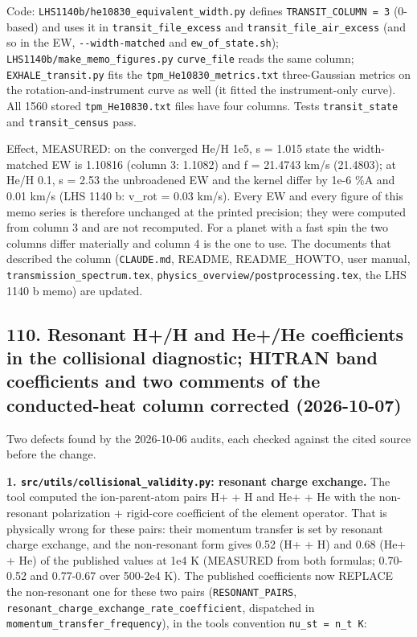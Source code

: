 \documentclass[english,a4paper]{my_memo}
\begin{document}
Code: \texttt{LHS1140b/he10830\_equivalent\_width.py} defines \texttt{TRANSIT\_COLUMN\ =\ 3}
(0-based) and uses it in \texttt{transit\_file\_excess} and \texttt{transit\_file\_air\_excess}
(and so in the EW, \texttt{-\/-width-matched} and \texttt{ew\_of\_state.sh});
\texttt{LHS1140b/make\_memo\_figures.py} \texttt{curve\_file} reads the same column;
\texttt{EXHALE\_transit.py} fits the \texttt{tpm\_He10830\_metrics.txt} three-Gaussian metrics
on the rotation-and-instrument curve as well (it fitted the instrument-only
curve). All 1560 stored \texttt{tpm\_He10830.txt} files have four columns. Tests
\texttt{transit\_state} and \texttt{transit\_census} pass.

Effect, MEASURED: on the converged He/H 1e5, s = 1.015 state the width-matched
EW is 1.10816 (column 3: 1.1082) and f = 21.4743 km/s (21.4803); at He/H 0.1,
s = 2.53 the unbroadened EW and the kernel differ by 1e-6 \%A and 0.01 km/s
(LHS 1140 b: v\_rot = 0.03 km/s). Every EW and every figure of this memo series
is therefore unchanged at the printed precision; they were computed from
column 3 and are not recomputed. For a planet with a fast spin the two
columns differ materially and column 4 is the one to use. The documents that
described the column (\texttt{CLAUDE.md}, README, README\_HOWTO, user manual,
\texttt{transmission\_spectrum.tex}, \texttt{physics\_overview/postprocessing.tex}, the
LHS 1140 b memo) are updated.

\subsection{110. Resonant H+/H and He+/He coefficients in the collisional diagnostic; HITRAN band coefficients and two comments of the conducted-heat column corrected (2026-10-07)}\label{110-resonant-hh-and-hehe-coefficients-in-the-collisional-diagnostic-hitran-band-coefficients-and-two-comments-of-the-conducted-heat-column-corrected-2026-10-07}

Two defects found by the 2026-10-06 audits, each checked against the cited
source before the change.

\textbf{1. \texttt{src/utils/collisional\_validity.py}: resonant charge exchange.} The
tool computed the ion-parent-atom pairs H+ + H and He+ + He with the
non-resonant polarization + rigid-core coefficient of the element operator.
That is physically wrong for these pairs: their momentum transfer is set by
resonant charge exchange, and the non-resonant form gives 0.52 (H+ + H) and
0.68 (He+ + He) of the published values at 1e4 K (MEASURED from both
formulas; 0.70-0.52 and 0.77-0.67 over 500-2e4 K). The published
coefficients now REPLACE the non-resonant one for these two pairs
(\texttt{RESONANT\_PAIRS}, \texttt{resonant\_charge\_exchange\_rate\_coefficient}, dispatched in
\texttt{momentum\_transfer\_frequency}), in the tool\textquotesingle s convention \texttt{nu\_st\ =\ n\_t\ K}:
\end{document}
